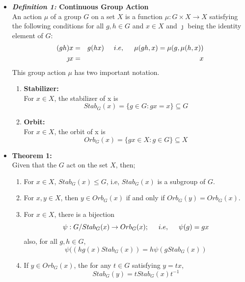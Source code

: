 \documentclass[12pt,onecolumn,letterpaper]{article} %
\begin{document}
\begin{itemize}
   \item  \textbf{\emph{Definition 1:} Continuous Group Action}\label{action}\\
    An action $\mu$ of a group $G$ on a set $X$ is a function $\mu : G\times X\to X$ satisfying the following conditions for all $g,h\in G$ and $x\in X$ and  $\jmath$ being the identity element of $G$:
     \begin{eqnarray*}
     (gh)x&=&g(hx)\hspace{.5cm} i.e, \hspace{.5cm} \mu(gh,x)=\mu(g,\mu(h,x))\\
     \jmath x&=&x
      \end{eqnarray*}
      This group action $\mu$ has two important notation.
      \begin{enumerate}
          \item \textbf{Stabilizer:}\\
          For $x\in X$, the stabilizer of x is
          \begin{equation}
              Stab_G(x)=\{g\in G : gx=x\}\subseteq G \label{stab}
          \end{equation}
          \item \textbf{Orbit:}\\
          For $x\in X$, the orbit of x is
          \begin{equation}
              Orb_G(x)=\{gx\in X : g\in G\}\subseteq X \label{orbit}
          \end{equation}
      \end{enumerate}
\item  \textbf{Theorem 1:}\\
Given that the $G$ act on  the set $X$, then;
\begin{enumerate}[label=\roman*.]
\item For $x\in X$, $Stab_G(x)\le G$, i.e, $Stab_G(x)$ is a subgroup of $G$.
\item For $x,y\in X$, then $y\in Orb_G(x)$ if and only if $Orb_G(y)=Orb_G(x)$.
\item For $x\in X$, there is a bijection
$$\psi : G/Stab_G(x)\to Orb_G(x); \hspace{.5cm} i.e, \hspace{.5cm}\psi(g)=gx$$
also, for all $g,h\in G$,
$$\psi((hg(x)Stab_G(x))=h\psi(g Stab_G(x))$$
\item If $y\in Orb_G(x)$, the for any $t\in G$ satisfying $y=tx$,
$$Stab_G(y)=tStab_G(x)t^{-1}$$
\end{enumerate}

\end{itemize}
\end{document}
